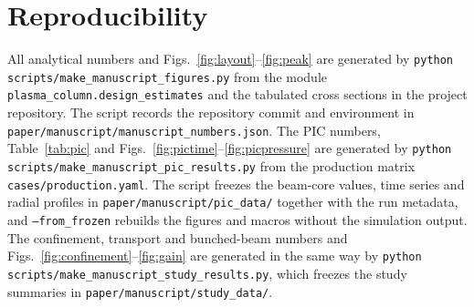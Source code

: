 \documentclass[aps,prab,10pt,twocolumn,superscriptaddress,showpacs,floatfix]{revtex4-2}
\begin{document}
\section{Reproducibility}
All analytical numbers and Figs.~\ref{fig:layout}--\ref{fig:peak} are generated by
\texttt{python scripts/make\_manuscript\_figures.py} from the module
\texttt{plasma\_column.design\_estimates} and the tabulated cross sections in the
project repository. The script records the repository commit and environment in
\texttt{paper/manuscript/manuscript\_numbers.json}. The PIC numbers, Table~\ref{tab:pic}
and Figs.~\ref{fig:pictime}--\ref{fig:picpressure} are generated by
\texttt{python scripts/make\_manuscript\_pic\_results.py} from the production matrix
\texttt{cases/production.yaml}. The script freezes the beam-core values, time series and
radial profiles in \texttt{paper/manuscript/pic\_data/} together with the run metadata,
and \texttt{--from\_frozen} rebuilds the figures and macros without the simulation output.
The confinement, transport and bunched-beam numbers and
Figs.~\ref{fig:confinement}--\ref{fig:gain} are generated in the same way by
\texttt{python scripts/make\_manuscript\_study\_results.py}, which freezes the study
summaries in \texttt{paper/manuscript/study\_data/}.


\end{document}
